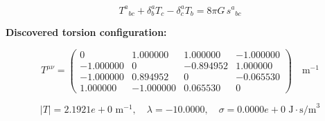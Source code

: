 
\begin{equation}
  T^a{}_{bc} + \delta^a_b T_c - \delta^a_c T_b = 8\pi G \, s^a{}_{bc}
\end{equation}

\textbf{Discovered torsion configuration:}

\begin{equation}
  T^{\mu\nu} = \begin{pmatrix}
    0 & 1.000000 & 1.000000 & -1.000000 \\
    -1.000000 & 0 & -0.894952 & 1.000000 \\
    -1.000000 & 0.894952 & 0 & -0.065530 \\
    1.000000 & -1.000000 & 0.065530 & 0
  \end{pmatrix} \quad \text{m}^{-1}
\end{equation}

\begin{equation}
  |T| = 2.1921e+0 \text{ m}^{-1}, \quad
  \lambda = -10.0000, \quad
  \sigma = 0.0000e+0 \text{ J}\cdot\text{s/m}^3
\end{equation}